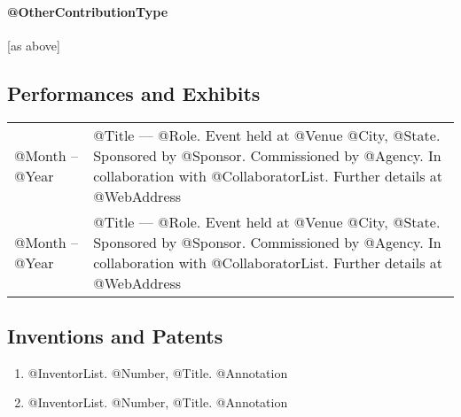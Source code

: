 \documentclass[10pt]{article}
\renewcommand{\new}[1]{\textcolor{red}{#1}}
\begin{document}
%
\printbibliography[title={\normalsize Electronic Publications},
 keyword=electronic,
 resetnumbers=true
]

\printbibliography[title={\normalsize \new{Technical Reports}},
 type=report,
 resetnumbers=true
]

\printbibliography[title={\normalsize Abstracts},
 keyword=abstract,
 resetnumbers=true
]

\printbibliography[title={\normalsize Reviews},
 keyword=review,
 resetnumbers=true
]

\paragraph{@OtherContributionType}
[as above]


\subsection*{Performances and Exhibits}
\smallskip

\begin{tabular}{l@{\quad\ }p{35em}} 
 @Month -- @Year
 & @Title --- @Role. Event held at @Venue @City, @State. 
   Sponsored by @Sponsor. 
   Commissioned by @Agency. 
   In collaboration with @CollaboratorList. 
   Further details at @WebAddress
\\[3.5ex]
 @Month -- @Year
 & @Title --- @Role. Event held at @Venue @City, @State. 
   Sponsored by @Sponsor. 
   Commissioned by @Agency. 
   In collaboration with @CollaboratorList. 
   Further details at @WebAddress
\end{tabular}

\subsection*{Inventions and Patents}
\smallskip

\begin{enumerate} \setlength{\itemsep}{0ex}
 \item @InventorList. @Number, @Title. @Annotation
 \item @InventorList. @Number, @Title. @Annotation
\end{enumerate}
\end{document}
